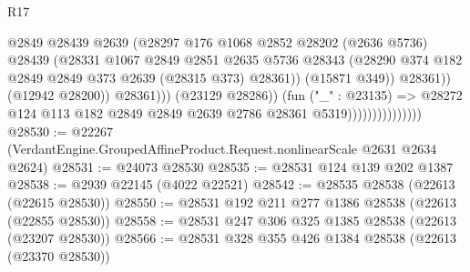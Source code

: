 \begin{lexlean}{R17}
\begin{coremodule}
                                              @2849
                                              @28439
                                              @2639
                                              (@28297
                                                @176
                                                @1068
                                                @2852
                                                @28202
                                                (@2636 @5736)
                                                @28439
                                                (@28331
                                                  @1067
                                                  @2849
                                                  @2851
                                                  @2635
                                                  @5736
                                                  @28343
                                                  (@28290
                                                    @374
                                                    @182
                                                    @2849
                                                    @2849
                                                    @373
                                                    @2639
                                                    (@28315 @373)
                                                    @28361))
                                                (@15871 @349))
                                              @28361))
                                          (@12942 @28200))
                                        @28361)))
                                  (@23129 @28286))
                                (fun ("_" : @23135) =>
                                @28272
                                  @124
                                  @113
                                  @182
                                  @2849
                                  @2849
                                  @2639
                                  @2786
                                  @28361
                                  @5319)))))))))))))))
@28530 := @22267 (VerdantEngine.GroupedAffineProduct.Request.nonlinearScale @2631 @2634 @2624)
@28531 := @24073 @28530
@28535 := @28531 @124 @139 @202 @1387
@28538 := @2939 @22145 (@4022 @22521)
@28542 := @28535 @28538 (@22613 (@22615 @28530))
@28550 := @28531 @192 @211 @277 @1386 @28538 (@22613 (@22855 @28530))
@28558 := @28531 @247 @306 @325 @1385 @28538 (@22613 (@23207 @28530))
@28566 := @28531 @328 @355 @426 @1384 @28538 (@22613 (@23370 @28530))

\end{coremodule}
\end{lexlean}
